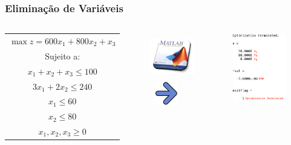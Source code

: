 \documentclass{beamer}
\begin{document}
\begin{frame}
	\frametitle{Eliminação de Variáveis}
	\begin{columns}
		\begin{column}{4cm}
			\only<1->
			{
				\centering
				\scriptsize
				\begin{table}
					\begin{tabular}{c}
						\cellcolor{red!50} $ \max z = 600x_1 + 800x_2  + x_3 $\\
						\cellcolor{red!50} Sujeito a: \\
						\cellcolor{red!50} $x_1 + x_2 + x_3 \le 100$ \\
						\cellcolor{red!50} $3x_1 + 2x_2 \le 240$ \\
						\cellcolor{red!50} $x_1 \le 60 $ \\
						\cellcolor{red!50} $x_2 \le 80 $ \\
					    \cellcolor{red!50} $x_1, x_2, x_3 \ge 0 $ \\
					\end{tabular}
				\end{table}
			}
		\end{column}
		\begin{column}{3cm}
			\only<2->
			{		
				\centering
				\includegraphics[width=2cm,height=2cm]{solver_matlab.png} \\
				\includegraphics[width=1.5cm,height=1cm]{seta_azul_direita.jpg} \\
			}
		\end{column}
		\begin{column}{4cm}
			\only<2->
			{		
				\centering
				\includegraphics[width=3cm,height=3cm]{Elimina_Matlab_1.png}
			}
		\end{column}
	\end{columns}
	\begin{columns}

\end{columns}
\end{frame}
\end{document}
